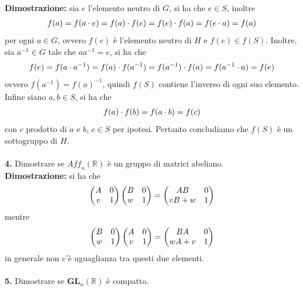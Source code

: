 \documentclass{article}
\begin{document}
\textbf{Dimostrazione:} sia $e$ l'elemento neutro di $G$, si ha che $e \in S$, inoltre
\begin{gather}
    f(a) = f(a \cdot e) = f(a) \cdot f(e) = f(e) \cdot f(a) = f(e \cdot a) = f(a) \notag
\end{gather}
per ogni $a \in G$, ovvero $f(e)$ è l'elemento neutro di $H$ e $f(e) \in f(S)$. Inoltre, sia $a^{-1} \in G$ tale che $aa^{-1} = e$, si ha che
\begin{gather}
    f(e) = f(a \cdot a^{-1}) = f(a) \cdot f(a^{-1}) = f(a^{-1}) \cdot f(a) = f(a^{-1} \cdot a) = f(e) \notag
\end{gather}
ovvero $f(a^{-1}) = f(a)^{-1}$, quindi $f(S)$ contiene l'inverso di ogni suo elemento. Infine siano $a, b \in S$, si ha che
\begin{gather}
    f(a) \cdot f(b) = f(a \cdot b) = f(c) \notag
\end{gather}
con $c$ prodotto di $a$ e $b$, $c \in S$ per ipotesi. Pertanto concludiamo che $f(S)$ è un sottogruppo di $H$. \\ \\
\textbf{4.} Dimostrare se $\textit{Aff}_n(\mathbb{R})$ è un gruppo di matrici abeliano. \\

\textbf{Dimostrazione:} si ha che
\begin{gather}
    \begin{pmatrix}
        A & 0 \\
        v & 1
    \end{pmatrix}
    \begin{pmatrix}
        B & 0 \\
        w & 1
    \end{pmatrix} = 
    \begin{pmatrix}
        AB & 0 \\
        vB + w & 1
    \end{pmatrix} \notag
\end{gather}
mentre
\begin{gather}
    \begin{pmatrix}
        B & 0 \\
        w & 1
    \end{pmatrix}
    \begin{pmatrix}
        A & 0 \\
        v & 1
    \end{pmatrix} = 
    \begin{pmatrix}
        BA & 0 \\
        wA + v & 1
    \end{pmatrix} \notag
\end{gather}
in generale non c'è uguaglianza tra questi due elementi. \\ \\
\textbf{5.} Dimostrare se $\mathbf{GL}_n(\mathbb{R})$ è compatto. \\
\end{document}
